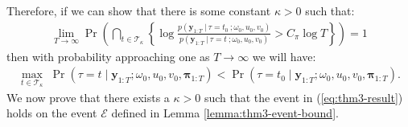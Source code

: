Therefore, if we can show that there is some constant $\kappa > 0$ such that:
\begin{align}
    \lim_{T\to\infty}\Pr\left(\bigcap_{t\in\mathcal{T}_{\kappa}}\left\{ \log \frac{p(\mathbf{y}_{1:T} \:|\:\tau = t_0 \:; \omega_0, u_0, v_0)}{p(\mathbf{y}_{1:T} \:|\:\tau = t \:; \omega_0, u_0, v_0)} > C_\pi \log T\right\}\right) = 1 \label{eq:thm3-result}
\end{align}
then with probability approaching one as $T \to \infty$ we will have:
\begin{align*}
    \max_{t\in\mathcal{T}_{\kappa}} \; \Pr(\tau = t  \;|\; \mathbf{y}_{1:T} ; \omega_0, u_0, v_0,\boldsymbol{\pi}_{1:T}) < \Pr(\tau = t_0  \;|\; \mathbf{y}_{1:T} ; \omega_0, u_0, v_0,\boldsymbol{\pi}_{1:T}).
\end{align*}
We now prove that there exists a $\kappa > 0$ such that the event in (\ref{eq:thm3-result}) holds on the event $\mathcal{E}$ defined in Lemma \ref{lemma:thm3-event-bound}.

